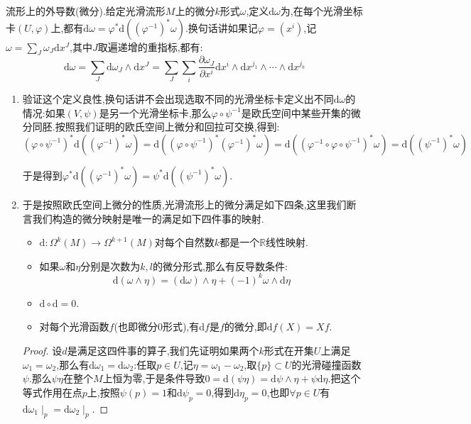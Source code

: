 流形上的外导数(微分).给定光滑流形$M$上的微分$k$形式$\omega$,定义$\mathrm{d}\omega$为,在每个光滑坐标卡$(U,\varphi)$上,都有$\mathrm{d}\omega=\varphi^*\mathrm{d}((\varphi^{-1})^*\omega)$.换句话讲如果记$\varphi=(x^i)$,记$\omega=\sum_J\omega_J\mathrm{d}x^J$,其中$J$取遍递增的重指标,都有:
$$\mathrm{d}\omega=\sum_J\mathrm{d}\omega_J\wedge\mathrm{d}x^J=\sum_J\sum_i\frac{\partial\omega_J}{\partial x^i}\mathrm{d}x^i\wedge\mathrm{d}x^{j_1}\wedge\cdots\wedge\mathrm{d}x^{j_k}$$
\begin{enumerate}
	\item 验证这个定义良性,换句话讲不会出现选取不同的光滑坐标卡定义出不同$\mathrm{d}\omega$的情况:如果$(V,\psi)$是另一个光滑坐标卡,那么$\varphi\circ\psi^{-1}$是欧氏空间中某些开集的微分同胚.按照我们证明的欧氏空间上微分和回拉可交换,得到:
	$$(\varphi\circ\psi^{-1})^*\mathrm{d}((\varphi^{-1})^*\omega)=\mathrm{d}((\varphi\circ\psi^{-1})^*(\varphi^{-1})^*\omega)=\mathrm{d}((\varphi^{-1}\circ\varphi\circ\psi^{-1})^*\omega)=\mathrm{d}((\psi^{-1})^*\omega)$$
	
	于是得到$\varphi^*\mathrm{d}((\varphi^{-1})^*\omega)=\psi^*\mathrm{d}((\psi^{-1})^*\omega)$.
	\item 于是按照欧氏空间上微分的性质,光滑流形上的微分满足如下四条,这里我们断言我们构造的微分映射是唯一的满足如下四件事的映射.
	\begin{itemize}
		\item $\mathrm{d}:\Omega^k(M)\to\Omega^{k+1}(M)$对每个自然数$k$都是一个$\mathbb{R}$线性映射.
		\item 如果$\omega$和$\eta$分别是次数为$k,l$的微分形式,那么有反导数条件:
		$$\mathrm{d}(\omega\wedge\eta)=(\mathrm{d}\omega)\wedge\eta+(-1)^k\omega\wedge\mathrm{d}\eta$$
		\item $\mathrm{d}\circ\mathrm{d}=0$.
		\item 对每个光滑函数$f$(也即微分0形式),有$\mathrm{d}f$是$f$的微分,即$\mathrm{d}f(X)=Xf$.
	\end{itemize}
    \begin{proof}
    	
    	设$d$是满足这四件事的算子,我们先证明如果两个$k$形式在开集$U$上满足$\omega_1=\omega_2$,那么有$\mathrm{d}\omega_1=\mathrm{d}\omega_2$:任取$p\in U$,记$\eta=\omega_1-\omega_2$,取$\{p\}\subset U$的光滑碰撞函数$\psi$.那么$\psi\eta$在整个$M$上恒为零,于是条件导致$0=\mathrm{d}(\psi\eta)=\mathrm{d}\psi\wedge\eta+\psi\mathrm{d}\eta$.把这个等式作用在点$p$上,按照$\psi(p)=1$和$\mathrm{d}\psi_p=0$,得到$\mathrm{d}\eta_p=0$,也即$\forall p\in U$有$\mathrm{d}\omega_1\mid_p=\mathrm{d}\omega_2\mid_p$.
    	

\end{proof}
\end{enumerate}
